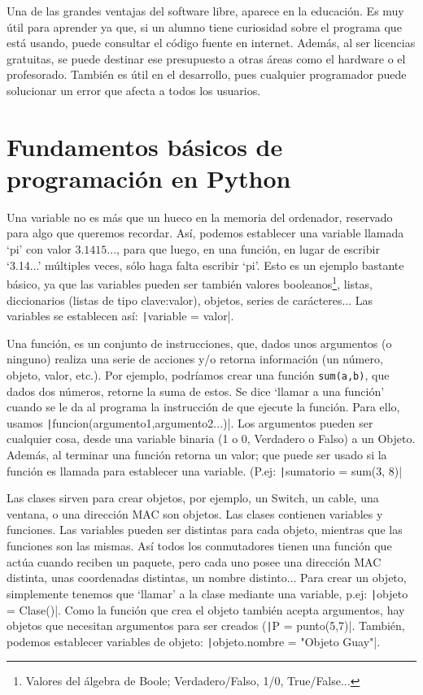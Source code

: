 \documentclass[a4paper, 11pt]{report} %
\begin{document}
Una de las grandes ventajas del software libre, aparece en la educación. Es muy útil para aprender ya que, si un alumno tiene curiosidad sobre el programa que está usando, puede consultar el código fuente en internet. Además, al ser licencias gratuitas, se puede destinar ese presupuesto a otras áreas como el hardware o el profesorado. También es útil en el desarrollo, pues cualquier programador puede solucionar un error que afecta a todos los usuarios.

\newpage
\section{Fundamentos básicos de programación en Python}
Una variable no es más que un hueco en la memoria del ordenador, reservado para algo que queremos recordar. Así, podemos establecer una variable llamada `pi' con valor $\mathsf{3.1415...}$, para que luego, en una función, en lugar de escribir `3.14...' múltiples veces, sólo haga falta escribir `pi'. Esto es un ejemplo bastante básico, ya que las variables pueden ser también valores booleanos\footnote{Valores del álgebra de Boole; Verdadero/Falso, 1/0, True/False...}, listas, diccionarios (listas de tipo clave:valor), objetos, series de carácteres...
Las variables se establecen así: \texttt|variable = valor|.

Una función, es un conjunto de instrucciones, que, dados unos argumentos (o ninguno) realiza una serie de acciones y/o retorna información (un número, objeto, valor, etc.). Por ejemplo, podríamos crear una función \texttt{sum(a,b)}, que dados dos números, retorne la suma de estos. Se dice `llamar a una función' cuando se le da al programa la instrucción de que ejecute la función. Para ello, usamos \texttt|funcion(argumento1,argumento2...)|. Los argumentos pueden ser cualquier cosa, desde una variable binaria (1 o 0, Verdadero o Falso) a un Objeto. Además, al terminar una función retorna un valor; que puede ser usado si la función es llamada para establecer una variable. (P.ej: \texttt|sumatorio = sum(3, 8)|

Las clases sirven para crear objetos, por ejemplo, un Switch, un cable, una ventana, o una dirección MAC son objetos. Las clases contienen variables y funciones. Las variables pueden ser distintas para cada objeto, mientras que las funciones son las mismas. Así todos los conmutadores tienen una función que actúa cuando reciben un paquete, pero cada uno posee una dirección MAC distinta, unas coordenadas distintas, un nombre distinto... Para crear un objeto, simplemente tenemos que `llamar' a la clase mediante una variable, p.ej: \texttt|objeto = Clase()|. Como la función que crea el objeto también acepta argumentos, hay objetos que necesitan argumentos para ser creados (\texttt|P = punto(5,7)|. También, podemos establecer variables de objeto: \texttt|objeto.nombre = "Objeto Guay"|.
\end{document}

